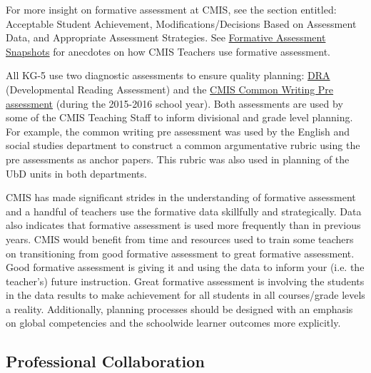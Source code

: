 \begin{findings}
For more insight on formative assessment at CMIS, see the section entitled: Acceptable Student Achievement, Modifications/Decisions Based on Assessment Data, and Appropriate Assessment Strategies. See \href{https://docs.google.com/a/cmis.ac.th/document/d/1yPhINDe21ApcJp3psbSCgmS9PHEBbxrCflrR2Adnwho/edit?usp=sharing}{Formative Assessment Snapshots} for anecdotes on how CMIS Teachers use formative assessment. 


All KG-5 use two diagnostic assessments to ensure quality planning: \href{https://drive.google.com/drive/folders/0ByVFfrm0zfolV29lcmM1WXVQOXc?usp=sharing}{DRA} (Developmental Reading Assessment) and the \href{https://drive.google.com/drive/folders/0ByVFfrm0zfolLU9Vb0ZBeF9uZjQ?usp=sharing}{CMIS Common Writing Pre assessment} (during the 2015-2016 school year). Both assessments are used by some of the CMIS Teaching Staff to inform divisional and grade level planning. For example, the common writing pre assessment was used by the English and social studies department to construct a common argumentative rubric using the pre assessments as anchor papers. This rubric was also used in planning of the UbD units in both departments. 


CMIS has made significant strides in the understanding of formative assessment and a handful of teachers use the formative data skillfully and strategically. Data also indicates that formative assessment is used more frequently than in previous years. CMIS would benefit from time and resources used to train some teachers on transitioning from good formative assessment to great formative assessment. Good formative assessment is giving it and using the data to inform your (i.e. the teacher’s) future instruction. Great formative assessment is involving the students in the data results to make achievement for all students in all courses/grade levels a reality. Additionally, planning processes should be designed with an emphasis on global competencies and the schoolwide learner outcomes more explicitly. 
\end{findings}

\subsection{Professional Collaboration}


